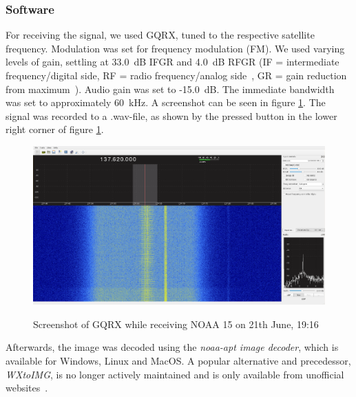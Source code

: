 \documentclass[conference]{IEEEtran}
\begin{document}
\subsubsection{Software}
For receiving the signal, we used GQRX, tuned to the respective satellite frequency. Modulation was set for frequency modulation (FM). We used varying levels of gain, settling at 33.0~dB IFGR and 4.0~dB RFGR (IF = intermediate frequency/digital side, RF = radio frequency/analog side~\cite{analog07rfif}, GR = gain reduction from maximum~\cite{github18gainreduction}). Audio gain was set to -15.0~dB. The immediate bandwidth was set to approximately 60~kHz. A screenshot can be seen in figure \ref{fig:gqrx_noaa15}. The signal was recorded to a .wav-file, as shown by the pressed button in the lower right corner of figure \ref{fig:gqrx_noaa15}.\\
\balance
\begin{figure}
	\centering
	\caption{Screenshot of GQRX while receiving NOAA 15 on 21th June, 19:16}
	\includegraphics[width=\textwidth]{gqrx_screenshot_noaa15} \label{fig:gqrx_noaa15}
\end{figure}
Afterwards, the image was decoded using the \textit{noaa-apt image decoder}, which is available for Windows, Linux and MacOS. A popular alternative and precedessor, \textit{WXtoIMG}, is no longer actively maintained and is only available from unofficial websites~\cite{bernardi19noaa-apt}. 
\end{document}
